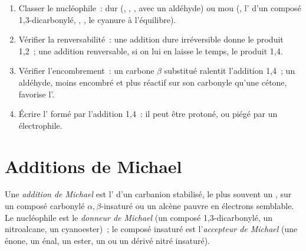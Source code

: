 \begin{method}\label{met:b2:conjugate-additions:predict-mode}
\begin{enumerate}
  \item Classer le nucléophile~: dur (, , ,  avec un aldéhyde)
        ou mou (, l' d'un composé 1,3-dicarbonylé, , , le cyanure
        à l'équilibre).
  \item Vérifier la renversabilité~: une addition dure irréversible donne le produit 1,2~; une addition
        renversable, si on lui en laisse le temps, le produit 1,4.
  \item Vérifier l'encombrement~: un carbone $\beta$ substitué ralentit l'addition 1,4~; un aldéhyde,
        moins encombré et plus réactif sur son carbonyle qu'une cétone, favorise l'.
  \item Écrire l' formé par l'addition 1,4~: il peut être protoné, ou piégé par un
        électrophile.
\end{enumerate}
\end{method}

\section{Additions de Michael}

\begin{definition}\label{def:b2:conjugate-additions:michael}
Une \emph{addition de Michael} est l' d'un carbanion
stabilisé, le plus souvent un , sur un composé carbonylé $\alpha,\beta$-insaturé ou un alcène
pauvre en électrons semblable. Le nucléophile est le \emph{donneur de Michael}
(un composé 1,3-dicarbonylé, un nitroalcane, un cyanoester)~; le composé insaturé est
l'\emph{accepteur de Michael}
(une énone, un énal, un ester, un  ou un dérivé nitré insaturé).
\end{definition}

